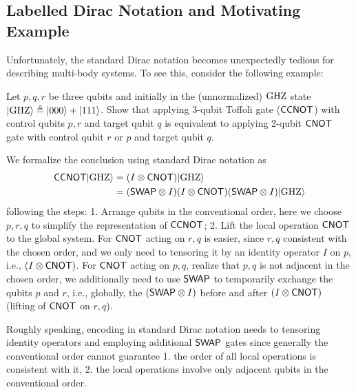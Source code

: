 \subsection{Labelled Dirac Notation and Motivating Example}

Unfortunately, the standard Dirac notation becomes unexpectedly tedious for describing multi-body systems. To see this, consider the following example:
\begin{example}
  \label{example1}
  Let $p,q,r$ be three qubits and initially in the (unnormalized) ${\mathrm{GHZ}}$ state $|{\mathrm{GHZ}}\rangle \triangleq |000\rangle+|111\rangle$. Show that applying 3-qubit Toffoli gate (${\mathsf{CCNOT}}$) with control qubits $p,r$ and target qubit $q$ is equivalent to applying 2-qubit ${\mathsf{CNOT}}$ gate with control qubit $r$ or $p$ and target qubit $q$. 
\end{example}
We formalize the conclusion using standard Dirac notation as
\begin{align*}
  {\mathsf{CCNOT}}|{\mathrm{GHZ}}\rangle &= (I\otimes {\mathsf{CNOT}})|{\mathrm{GHZ}}\rangle \\
  &= ({\mathsf{SWAP}}\otimes I)(I\otimes {\mathsf{CNOT}})({\mathsf{SWAP}}\otimes I)|{\mathrm{GHZ}}\rangle
\end{align*}
following the steps: 1. Arrange qubits in the conventional order, here we choose $p,r,q$ to simplify the representation of ${\mathsf{CCNOT}}$; 2. Lift the local operation ${\mathsf{CNOT}}$ to the global system. For ${\mathsf{CNOT}}$ acting on $r,q$ is easier, since $r,q$ consistent with the chosen order, and we only need to tensoring it by an identity operator $I$ on $p$, i.e., $(I\otimes {\mathsf{CNOT}})$.
For ${\mathsf{CNOT}}$ acting on $p,q$, realize that $p,q$ is not adjacent in the chosen order, we additionally need to use ${\mathsf{SWAP}}$ to temporarily exchange the qubits $p$ and $r$, i.e., globally, the $({\mathsf{SWAP}}\otimes I)$ before and after $(I\otimes {\mathsf{CNOT}})$ (lifting of ${\mathsf{CNOT}}$ on $r,q$).

Roughly speaking, encoding in standard Dirac notation needs to tensoring identity operators and employing additional ${\mathsf{SWAP}}$ gates since generally the conventional order cannot guarantee 1. the order of all local operations is consistent with it, 2. the local operations involve only adjacent qubits in the conventional order.

